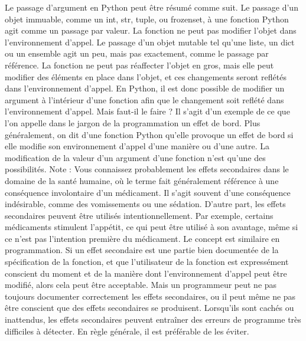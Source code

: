 Le passage d'argument en Python peut être résumé comme suit. Le passage d'un objet immuable, comme un int, str, tuple, ou frozenset, à une fonction Python agit comme un passage par valeur.  La fonction ne peut pas modifier l'objet dans l'environnement d'appel.
Le passage d'un objet mutable tel qu'une liste, un dict ou un ensemble agit un peu, mais pas exactement, comme le passage par référence.  La fonction ne peut pas réaffecter l'objet en gros, mais elle peut modifier des éléments en place dans l'objet, et ces changements seront reflétés dans l'environnement d'appel.
En Python, il est donc possible de modifier un argument à l'intérieur d'une fonction afin que le changement soit reflété dans l'environnement d'appel.  Mais faut-il le faire ? Il s'agit d'un exemple de ce que l'on appelle dans le jargon de la programmation un effet de bord.  
Plus généralement, on dit d'une fonction Python qu'elle provoque un effet de bord si elle modifie son environnement d'appel d'une manière ou d'une autre. La modification de la valeur d'un argument d'une fonction n'est qu'une des possibilités.
Note : Vous connaissez probablement les effets secondaires dans le domaine de la santé humaine, où le terme fait généralement référence à une conséquence involontaire d'un médicament. Il s'agit souvent d'une conséquence indésirable, comme des vomissements ou une sédation.  D'autre part, les effets secondaires peuvent être utilisés intentionnellement. Par exemple, certains médicaments stimulent l'appétit, ce qui peut être utilisé à son avantage, même si ce n'est pas l'intention première du médicament.
Le concept est similaire en programmation.  Si un effet secondaire est une partie bien documentée de la spécification de la fonction, et que l'utilisateur de la fonction est expressément conscient du moment et de la manière dont l'environnement d'appel peut être modifié, alors cela peut être acceptable. Mais un programmeur peut ne pas toujours documenter correctement les effets secondaires, ou il peut même ne pas être conscient que des effets secondaires se produisent.
Lorsqu'ils sont cachés ou inattendus, les effets secondaires peuvent entraîner des erreurs de programme très difficiles à détecter.  En règle générale, il est préférable de les éviter.
